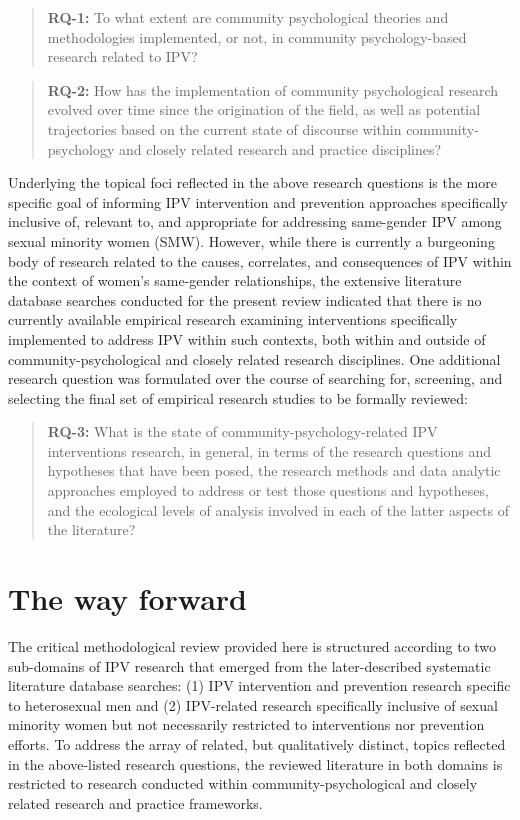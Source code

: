 \documentclass[11pt,]{tufte-book}
\newcommand{\rowgroup}[2][-1em]{\hspace{#1}#2}
\begin{document}
\begin{quote}
\rowgroup[-3em]{\textbf{RQ-1:} To what extent are community psychological theories and methodologies implemented, or not, in community psychology-based research related to IPV?}
\end{quote}

\begin{quote}
\rowgroup[-3em]{\textbf{RQ-2:} How has the implementation of community psychological research evolved over time since the origination of the field, as well as potential trajectories based on the current state of discourse within community-psychology and closely related research and practice disciplines?}
\end{quote}

Underlying the topical foci reflected in the above research questions is
the more specific goal of informing IPV intervention and prevention
approaches specifically inclusive of, relevant to, and appropriate for
addressing same-gender IPV among sexual minority women (SMW). However,
while there is currently a burgeoning body of research related to the
causes, correlates, and consequences of IPV within the context of
women's same-gender relationships, the extensive literature database
searches conducted for the present review indicated that there is no
currently available empirical research examining interventions
specifically implemented to address IPV within such contexts, both
within and outside of community-psychological and closely related
research disciplines. One additional research question was formulated
over the course of searching for, screening, and selecting the final set
of empirical research studies to be formally reviewed:

\begin{quote}
\rowgroup[-3em]{\textbf{RQ-3:} What is the state of community-psychology-related IPV interventions research, in general, in terms of the research questions and hypotheses that have been posed, the research methods and data analytic approaches employed to address or test those questions and hypotheses, and the ecological levels of analysis involved in each of the latter aspects of the literature?}
\end{quote}

\chapter{The way forward}\label{the-way-forward}

The critical methodological review provided here is structured according
to two sub-domains of IPV research that emerged from the later-described
systematic literature database searches: (1) IPV intervention and
prevention research specific to heterosexual men and (2) IPV-related
research specifically inclusive of sexual minority women but not
necessarily restricted to interventions nor prevention efforts. To
address the array of related, but qualitatively distinct, topics
reflected in the above-listed research questions, the reviewed
literature in both domains is restricted to research conducted within
community-psychological and closely related research and practice
frameworks.
\end{document}
